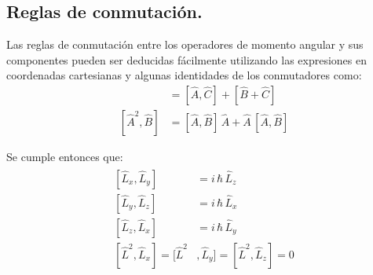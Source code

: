 
\subsection{Reglas de conmutación.}

Las reglas de conmutación entre los operadores de momento angular y sus componentes pueden ser deducidas fácilmente utilizando las expresiones en coordenadas cartesianas y algunas identidades de los conmutadores como:
\begin{align*}
[ \hat{A} + \hat{B}, \hat{C}] &= [\hat{A}, \hat{C}] + [\hat{B} + \hat{C}] \\[0.5em]
[ \hat{A}^{2} , \hat{B}] &= [\hat{A}, \hat{B}] \, \hat{A} +  \hat{A} \, [\hat{A} , \hat{B}]
\end{align*}

Se cumple entonces que:
\begin{align}
\begin{aligned}
[ \hat{L}_{x}, \hat{L}_{y} ] &= i \, \hbar \, \hat{L}_{z} \\[0.5em]
[ \hat{L}_{y}, \hat{L}_{z} ] &= i \, \hbar \, \hat{L}_{x} \\[0.5em]
[ \hat{L}_{z}, \hat{L}_{x} ] &= i \, \hbar \, \hat{L}_{y} \\[0.5em]
[\hat{L}^{2}, \hat{L}_{x}] = [\hat{L}^{2}&, \hat{L}_{y}] = [\hat{L}^{2}, \hat{L}_{z}] = 0
\end{aligned}
\label{eq:ecuacion_01_07}
\end{align}

